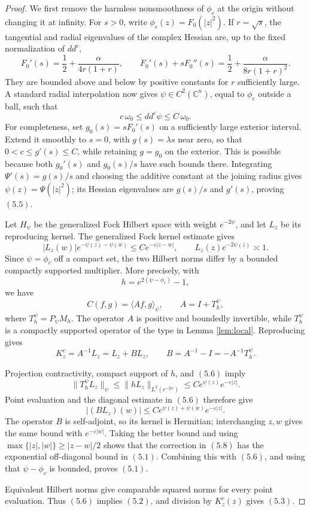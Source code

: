 \documentclass[11pt]{article}
\newcommand{\Cn}{\mathbb C^n}
\newcommand{\ip}[2]{\langle #1,#2\rangle}
\begin{document}
\begin{proof}
We first remove the harmless nonsmoothness of \(\phi_c\) at the origin without
changing it at infinity.  For \(s>0\), write \(\phi_c(z)=F_0(|z|^2)\).  If
\(r=\sqrt{s}\), the tangential and radial eigenvalues of the complex Hessian
are, up to the fixed normalization of \(dd^c\),
\[
 F_0'(s)=\frac12+\frac{\alpha}{4r(1+r)},\qquad
 F_0'(s)+sF_0''(s)=\frac12+\frac{\alpha}{8r(1+r)^2}.              \tag{5.4}
\]
They are bounded above and below by positive constants for \(r\) sufficiently
large.  A standard radial interpolation now gives
\(\psi\in C^2(\Cn)\), equal to \(\phi_c\) outside a ball, such that
\[
 c\,\omega_0\leq dd^c\psi\leq C\,\omega_0.                      \tag{5.5}
\]
For completeness, set \(g_0(s)=sF_0'(s)\) on a sufficiently large exterior
interval.  Extend it smoothly to \(s=0\), with \(g(s)=\lambda s\) near zero,
so that \(0<c\leq g'(s)\leq C\), while retaining \(g=g_0\) on the exterior.
This is possible because both \(g_0'(s)\) and \(g_0(s)/s\) have such bounds
there.  Integrating \(\Psi'(s)=g(s)/s\) and choosing the additive constant at
the joining radius gives \(\psi(z)=\Psi(|z|^2)\); its Hessian eigenvalues are
\(g(s)/s\) and \(g'(s)\), proving \((5.5)\).

Let \(H_\psi\) be the generalized Fock Hilbert space with weight
\(e^{-2\psi}\), and let \(L_z\) be its reproducing kernel.  The generalized
Fock kernel estimate \cite[Lemmas 2.1--2.2]{IVW} gives
\[
 |L_z(w)|e^{-\psi(z)-\psi(w)}\leq C e^{-\varepsilon|z-w|},
 \qquad L_z(z)e^{-2\psi(z)}\asymp1.                              \tag{5.6}
\]
Since \(\psi=\phi_c\) off a compact set, the two Hilbert norms differ by a
bounded compactly supported multiplier.  More precisely, with
\[
 h=e^{2(\psi-\phi_c)}-1,
\]
we have
\[
 C(f,g)=\ip{Af}{g}_{\psi},\qquad A=I+T_h^\psi,                   \tag{5.7}
\]
where \(T_h^\psi=P_\psi M_h\).  The operator \(A\) is positive and boundedly
invertible, while \(T_h^\psi\) is a compactly supported operator of the type
in Lemma \ref{lem:local}.  Reproducing gives
\[
 K^c_z=A^{-1}L_z=L_z+BL_z,
 \qquad B=A^{-1}-I=-A^{-1}T_h^\psi.                              \tag{5.8}
\]

Projection contractivity, compact support of \(h\), and \((5.6)\) imply
\[
 \|T_h^\psi L_z\|_\psi
 \leq \|hL_z\|_{L^2(e^{-2\psi})}
 \leq C e^{\psi(z)}e^{-\varepsilon|z|}.                         \tag{5.9}
\]
Point evaluation and the diagonal estimate in \((5.6)\) therefore give
\[
 |(BL_z)(w)|\leq C e^{\psi(z)+\psi(w)}e^{-\varepsilon|z|}.       \tag{5.10}
\]
The operator \(B\) is self-adjoint, so its kernel is Hermitian; interchanging
\(z,w\) gives the same bound with \(e^{-\varepsilon|w|}\).  Taking the better
bound and using
\(\max\{|z|,|w|\}\geq |z-w|/2\) shows that the correction in \((5.8)\)
has the exponential off-diagonal bound in \((5.1)\).  Combining this with
\((5.6)\), and using that \(\psi-\phi_c\) is bounded, proves \((5.1)\).

Equivalent Hilbert norms give comparable squared norms for every point
evaluation.  Thus \((5.6)\) implies \((5.2)\), and division by
\(K^c_z(z)\) gives \((5.3)\).
\end{proof}
\end{document}
